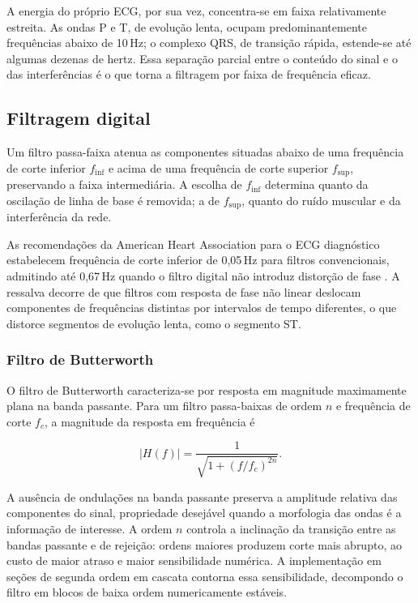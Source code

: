 A energia do próprio \gls{ECG}, por sua vez, concentra-se em faixa
relativamente estreita. As ondas P e T, de evolução lenta, ocupam
predominantemente frequências abaixo de 10\,Hz; o complexo QRS, de
transição rápida, estende-se até algumas dezenas de hertz. Essa separação
parcial entre o conteúdo do sinal e o das interferências é o que torna a
filtragem por faixa de frequência eficaz.

\subsection{Filtragem digital}
\label{subsec:fund-filtragem}

Um filtro passa-faixa atenua as componentes situadas abaixo de uma
frequência de corte inferior $f_{\mathrm{inf}}$ e acima de uma frequência de
corte superior $f_{\mathrm{sup}}$, preservando a faixa intermediária. A
escolha de $f_{\mathrm{inf}}$ determina quanto da oscilação de linha de base é
removida; a de $f_{\mathrm{sup}}$, quanto do ruído muscular e da interferência
da rede.

As recomendações da American Heart Association para o \gls{ECG} diagnóstico
estabelecem frequência de corte inferior de 0,05\,Hz para filtros
convencionais, admitindo até 0,67\,Hz quando o filtro digital não introduz
distorção de fase \cite{kligfield2007recommendations}. A ressalva decorre de
que filtros com resposta de fase não linear deslocam componentes de
frequências distintas por intervalos de tempo diferentes, o que distorce
segmentos de evolução lenta, como o segmento ST.

\subsubsection{Filtro de Butterworth}
\label{subsubsec:fund-butterworth}

O filtro de Butterworth \cite{butterworth1930theory} caracteriza-se por
resposta em magnitude maximamente plana na banda passante. Para um filtro
passa-baixas de ordem $n$ e frequência de corte $f_c$, a magnitude da
resposta em frequência é

\begin{equation}
	|H(f)| = \frac{1}{\sqrt{1 + (f / f_c)^{2n}}}.
	\label{eq:butterworth}
\end{equation}

A ausência de ondulações na banda passante preserva a amplitude relativa das
componentes do sinal, propriedade desejável quando a morfologia das ondas é a
informação de interesse. A ordem $n$ controla a inclinação da transição entre
as bandas passante e de rejeição: ordens maiores produzem corte mais abrupto,
ao custo de maior atraso e maior sensibilidade numérica. A implementação em
seções de segunda ordem em cascata contorna essa sensibilidade, decompondo o
filtro em blocos de baixa ordem numericamente estáveis.

